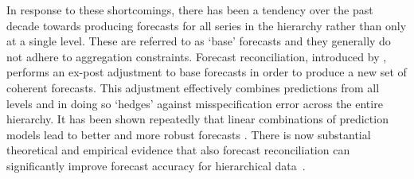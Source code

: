 \documentclass[a4paper,fleqn,11pt]{article}
\begin{document}
In response to these shortcomings, there has been a tendency over the past decade towards producing forecasts for all series in the hierarchy rather than only at a single level. These are referred to as `base' forecasts and they generally do not adhere to aggregation constraints. Forecast reconciliation, introduced by \cite{Hyndman2011}, performs an ex-post adjustment to base forecasts in order to produce a new set of coherent forecasts. This adjustment effectively combines predictions from all levels and in doing so `hedges' against misspecification error across the entire hierarchy. It has been shown repeatedly that linear combinations of prediction models lead to better and more robust forecasts \citep[see for instance][]{Stock2006,Conflitti2015}. There is now substantial theoretical and empirical evidence that also forecast reconciliation can significantly improve forecast accuracy for hierarchical data~\citep[see][and references therein]{Wickramasuriya2015}.
\end{document}
